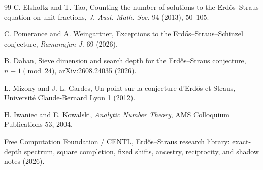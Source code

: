 \documentclass[11pt]{article}
\theoremstyle{definition}
\begin{document}
\begin{thebibliography}{99}
C. Elsholtz and T. Tao,
Counting the number of solutions to the Erd\H{o}s--Straus equation on unit fractions,
\emph{J. Aust. Math. Soc.} 94 (2013), 50--105.

C. Pomerance and A. Weingartner,
Exceptions to the Erd\H{o}s--Straus--Schinzel conjecture,
\emph{Ramanujan J.} 69 (2026).

B. Dahan,
Sieve dimension and search depth for the Erd\H{o}s--Straus conjecture, $n\equiv1\pmod{24}$,
arXiv:2608.24035 (2026).

L. Mizony and J.-L. Gardes,
Un point sur la conjecture d'Erd\H{o}s et Straus,
Universit\'e Claude-Bernard Lyon 1 (2012).

H. Iwaniec and E. Kowalski,
\emph{Analytic Number Theory},
AMS Colloquium Publications 53, 2004.

Free Computation Foundation / CENTL,
Erd\H{o}s--Straus research library: exact-depth spectrum, square completion, fixed shifts, ancestry, reciprocity, and shadow notes (2026).
\end{thebibliography}
\end{document}

